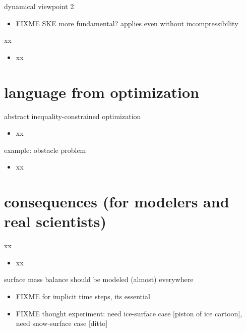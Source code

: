 \documentclass[10pt,hyperref,dvipsnames]{beamer}
\begin{document}
\begin{frame}{dynamical viewpoint 2}
\begin{itemize}
\item FIXME SKE more fundamental? applies even without incompressibility
\end{itemize}
\end{frame}


\begin{frame}{xx}
\begin{itemize}
\item xx
\end{itemize}
\end{frame}


\section{language from optimization}

\begin{frame}{abstract inequality-constrained optimization}
\begin{itemize}
\item xx
\end{itemize}
\end{frame}

\begin{frame}{example: obstacle problem}
\begin{itemize}
\item xx
\end{itemize}
\end{frame}


\section{consequences (for modelers and real scientists)}

\begin{frame}{xx}
\begin{itemize}
\item xx
\end{itemize}
\end{frame}

\begin{frame}{surface mass balance should be modeled (almost) everywhere}
\begin{itemize}
\item FIXME for implicit time steps, its essential
\item FIXME thought experiment: need ice-surface case [piston of ice cartoon], need snow-surface case [ditto]
\end{itemize}
\end{frame}
\end{document}
